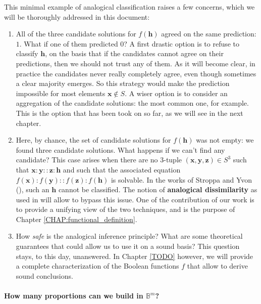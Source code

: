 This minimal example of analogical classification raises a few concerns, which
we will be thoroughly addressed in this document:
\begin{enumerate}
  \item All of the three candidate solutions for $f(\mathbf{h})$ agreed on the
    same prediction: $1$. What if one of them predicted $0$? A first drastic
    option is to refuse to classify $\mathbf{h}$, on the basis that if the
    candidates cannot agree on their predictions, then we should not trust any
    of them. As it will become clear, in practice the candidates never really
    completely agree, even though sometimes a clear majority emerges. So this
    strategy would make the prediction impossible for most elements $\mathbf{x}
    \notin S$. A wiser option is to consider an aggregation of the candidate
    solutions: the most common one, for example. This is the option that has
    been took on so far, as we will see in the next chapter.
  \item Here, by chance, the set of candidate solutions for $f(\mathbf{h})$ was
    not empty: we found three candidate solutions. What happens if we can't
    find any candidate? This case arises when there are no 3-tuple
    $(\mathbf{x}, \mathbf{y}, \mathbf{z}) \in S^3$ such that $\mathbf{x} :
    \mathbf{y}::\mathbf{z}:\mathbf{h}$ and such that the associated equation
    $f(\mathbf{x}):f(\mathbf{y})::f(\mathbf{z}):f(\mathbf{h})$ is solvable. In
    the works of Stroppa and Yvon (\cite{StrYvoCNLL05}), such an $\mathbf{h}$
    cannot be classified. The notion of \textbf{analogical dissimilarity}
    as used in \cite{BayMicDelIJCAI07} will allow to bypass this issue. One of
    the contribution of our work is to provide a unifying view of the two
    techniques, and is the purpose of Chapter \ref{CHAP:functional_definition}.

  \item How \textit{safe} is the analogical inference principle? What are some
    theoretical guarantees that could allow us to use it on a sound basis? This
    question stays, to this day, unanswered. In Chapter \ref{TODO} however, we
    will provide a complete characterization of the Boolean functions $f$ that
    allow to derive sound conclusions.
\end{enumerate}

\paragraph{How many proportions can we build in $\mathbb{B}^m$?\\}
\label{SEC:number_of_parallelograms_in_Bm}

